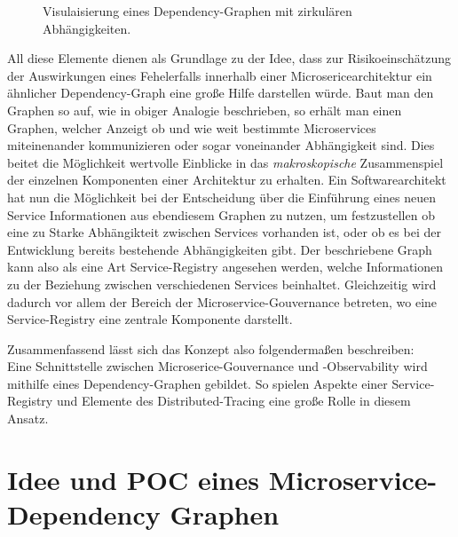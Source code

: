 \documentclass[
	12pt,
	BCOR=5mm,
	DIV=12,
	headinclude=on,
	footinclude=off,
	parskip=half,
	bibliography=totoc,
	listof=entryprefix,
	toc=listof,
	numbers=noenddot,
	plainfootsepline
]{scrreprt}
\begin{document}
\begin{figure}[h]
	\centering
	\caption{Visulaisierung eines Dependency-Graphen mit zirkulären Abhängigkeiten. \cite{GraphViz}}
	\label{fig:GraphViz}
\end{figure}
 All diese Elemente dienen als Grundlage zu der Idee, dass zur Risikoeinschätzung der Auswirkungen eines Fehelerfalls innerhalb einer Microsericearchitektur ein ähnlicher Dependency-Graph eine große Hilfe darstellen würde. Baut man den Graphen so auf, wie in obiger Analogie beschrieben, so erhält man einen Graphen, welcher Anzeigt ob und wie weit bestimmte Microservices miteinenander kommunizieren oder sogar voneinander Abhängigkeit sind. Dies beitet die Möglichkeit wertvolle Einblicke in das \textit{makroskopische} Zusammenspiel der einzelnen Komponenten einer Architektur zu erhalten. Ein Softwarearchitekt hat nun die Möglichkeit bei der Entscheidung über die Einführung eines neuen Service Informationen aus ebendiesem Graphen zu nutzen, um festzustellen ob eine zu Starke Abhängikteit zwischen Services vorhanden ist, oder ob es bei der Entwicklung bereits bestehende Abhängigkeiten gibt.
Der beschriebene Graph kann also als eine Art Service-Registry angesehen werden, welche Informationen zu der Beziehung zwischen verschiedenen Services beinhaltet. Gleichzeitig wird dadurch vor allem der Bereich der Microservice-Gouvernance betreten, wo eine Service-Registry eine zentrale Komponente darstellt. 

Zusammenfassend lässt sich das Konzept also folgendermaßen beschreiben: \\
Eine Schnittstelle zwischen Microserice-Gouvernance und -Observability wird mithilfe eines Dependency-Graphen gebildet. So spielen Aspekte einer Service-Registry und Elemente des Distributed-Tracing eine große Rolle in diesem Ansatz. 
\chapter{Idee und POC eines Microservice-Dependency Graphen}
\end{document}
